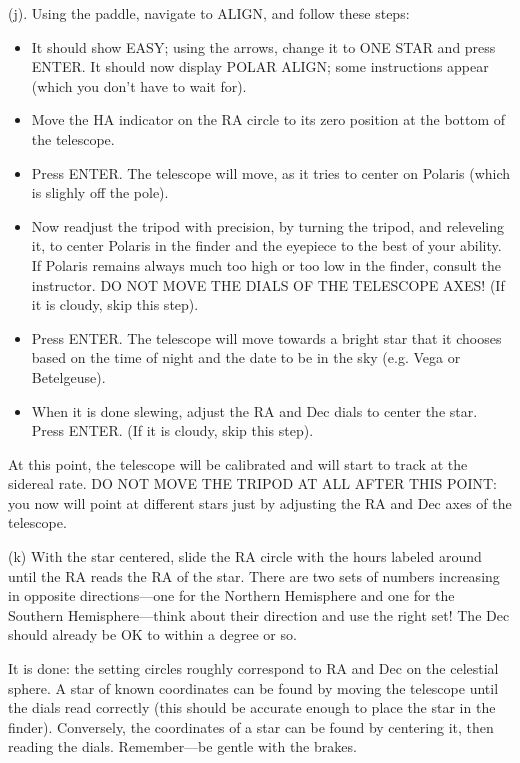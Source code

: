 \medskip\noindent (j). Using the paddle, navigate to ALIGN, and follow
these steps:
\begin{itemize}
\item It should show EASY; using the arrows, change it to ONE STAR and
press ENTER. It should now display POLAR ALIGN; some instructions
appear (which you don't have to wait for).
\item Move the HA indicator on the RA circle to its zero position at
the bottom of the telescope. 
\item Press ENTER. The telescope will move, as it tries to center on
Polaris (which is slighly off the pole).
\item Now readjust the tripod with precision, by turning the tripod,
and releveling it, to center Polaris in the finder and the eyepiece to
the best of your ability. If Polaris remains always much too high or
too low in the finder, consult the instructor. DO NOT MOVE THE DIALS
OF THE TELESCOPE AXES! (If it is cloudy, skip this step).
\item Press ENTER. The telescope will move towards a bright star that it
chooses based on the time of night and the date to be in the sky
(e.g. Vega or Betelgeuse).
\item When it is done slewing, adjust the RA and Dec dials to center the
star. Press ENTER. (If it is cloudy, skip this step).
\end{itemize}

At this point, the telescope will be calibrated and will start to
track at the sidereal rate. DO NOT MOVE THE TRIPOD AT ALL AFTER THIS
POINT: you now will point at different stars just by adjusting the RA
and Dec axes of the telescope.

\medskip\noindent
(k) With the star centered, slide the RA circle with the hours labeled
around until the RA reads the RA of the star. There are two sets of
numbers increasing in opposite directions---one for the Northern
Hemisphere and one for the Southern Hemisphere---think about their
direction and use the right set! The Dec should already be OK to
within a degree or so.

\medskip\noindent
It is done: the setting circles roughly correspond to RA and
Dec on the celestial sphere. A star of known coordinates can be found
by moving the telescope until the dials read correctly (this should
be accurate enough to place the star in the finder). Conversely, the
coordinates of a star can be found by centering it, then reading the
dials. Remember---be gentle with the brakes.
